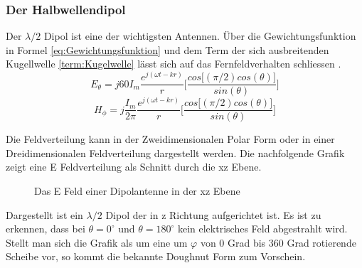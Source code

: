 \subsubsection{Der Halbwellendipol}
Der $\lambda/2$ Dipol ist eine der wichtigsten Antennen. Über die Gewichtungsfunktion in Formel \ref{eq:Gewichtungsfunktion} und dem Term der sich ausbreitenden Kugellwelle \ref{term:Kugelwelle} lässt sich auf das Fernfeldverhalten schliessen \cite{elliott1981antenna}.
\begin{equation}
E_{\theta}=j60I_{m} \frac{e^{j(\omega t - kr)}}{r} \lbrack \frac{cos\lbrack  (\pi/2) cos(\theta)\rbrack}{sin(\theta)} \rbrack
\end{equation}
\begin{equation}
H_{\phi}=j \frac{I_{m}}{2\pi} \frac{e^{j(\omega t - kr)}}{r} \lbrack \frac{cos\lbrack  (\pi/2) cos(\theta)\rbrack}{sin(\theta)} \rbrack
\end{equation}

Die Feldverteilung kann in der  Zweidimensionalen Polar Form oder in einer Dreidimensionalen Feldverteilung dargestellt werden.
Die nachfolgende Grafik zeigt eine E Feldverteilung als Schnitt durch die xz Ebene.\\

\begin{figure}[h]
\begin{center}
\end{center}
	\caption{Das E Feld einer Dipolantenne in der xz Ebene}
	\label{fig:DipolEFerd}
\end{figure}



Dargestellt ist ein $\lambda/2$ Dipol der in z Richtung aufgerichtet ist. Es ist zu erkennen, dass bei $\theta = 0 ^\circ $  und $\theta = 180 ^\circ $ kein elektrisches Feld abgestrahlt wird. Stellt man sich die Grafik als um eine um $\varphi$ von 0 Grad bis 360 Grad rotierende Scheibe vor, so kommt die bekannte Doughnut Form zum Vorschein.

